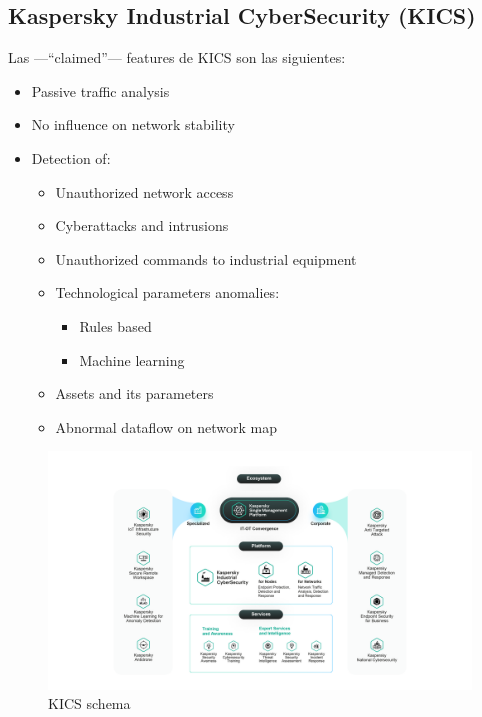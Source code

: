 \subsection{Kaspersky Industrial CyberSecurity (\textsc{KICS})}
\begin{paracol}{2}
   
   Las ---``claimed''--- features de \textsc{KICS} son las siguientes:
   \begin{itemize}
	\item Passive traffic analysis
	\item No influence on network stability
	\item Detection of:
	\begin{itemize}
      \item Unauthorized network access
      \item Cyberattacks and intrusions
      \item Unauthorized commands to industrial equipment
      \item Technological parameters anomalies:
      \begin{itemize}
         \item Rules based
	      \item Machine learning
      \end{itemize}
      \item Assets and its parameters
      \item Abnormal dataflow on network map
   \end{itemize}
\end{itemize}

\switchcolumn

\colfill
\begin{figure}[htbp]
   \centering
   \includegraphics[width=0.95\columnwidth]{images/KICS.png}
   \caption{\textsc{KICS} schema}
   \label{fig:KICS}
\end{figure}
\colfill

\end{paracol}
